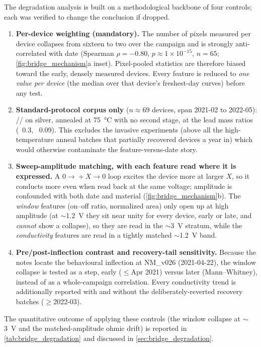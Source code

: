 The degradation analysis is built on a methodological backbone of four controls;
each was verified to change the conclusion if dropped.
\begin{enumerate}
  \item \textbf{Per-device weighting (mandatory).} The number of pixels measured per device collapses from sixteen to two over the campaign and is strongly anti-correlated with date (Spearman $\rho=-0.80$, $p\approx1\times10^{-15}$, $n=65$; \cref{fig:bridge_mechanism}a inset). Pixel-pooled statistics are therefore biased toward the early, densely measured devices. Every feature is reduced to \emph{one value per device} (the median over that device's freshest-day curves) before any test.
  \item \textbf{Standard-protocol corpus only} ($n\approx69$ devices, span 2021-02 to 2022-05): \SY{}/\Hybrane{}/\LiTf{} on silver, annealed at \SI{75}{\celsius} with no second stage, at the lead mass ratios (\Hybrane{}~\num{0.3}, \LiTf{}~\num{0.09}). This excludes the invasive experiments (above all the high-temperature anneal batches that partially recovered devices a year in) which would otherwise contaminate the feature-versus-date story.
  \item \textbf{Sweep-amplitude matching, with each feature read where it is expressed.} A $0\!\to\!+X\!\to\!0$ loop excites the device more at larger $X$, so it conducts more even when read back at the same voltage; amplitude is confounded with both date and material (\cref{fig:bridge_mechanism}b). The \emph{window} features (on--off ratio, normalized area) only open up at high amplitude (at $\sim$\SI{1.2}{\volt} they sit near unity for every device, early or late, and \emph{cannot} show a collapse), so they are read in the $\sim$\SI{3}{\volt} stratum, while the \emph{conductivity} features are read in a tightly matched $\sim$\SI{1.2}{\volt} band.
  \item \textbf{Pre/post-inflection contrast and recovery-tail sensitivity.} Because the notes locate the behavioural inflection at NM\_v026 (2021-04-22), the window collapse is tested as a step, early ($\leq$Apr 2021) versus later (Mann--Whitney), instead of as a whole-campaign correlation. Every conductivity trend is additionally reported with and without the deliberately-reverted recovery batches ($\geq$2022-03).
\end{enumerate}
The quantitative outcome of applying these controls (the window collapse at
$\sim$\SI{3}{\volt} and the matched-amplitude ohmic drift) is reported in
\cref{tab:bridge_degradation} and discussed in \cref{sec:bridge_degradation}.
